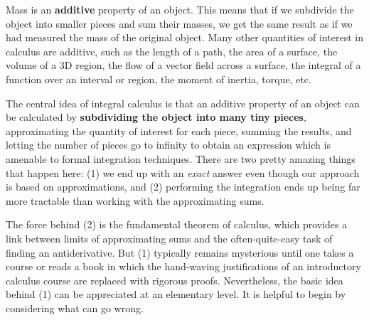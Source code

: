 \documentclass{watsonbook}
\begin{document}
Mass is an \textbf{additive} property of an object. This means that if
we subdivide the object into smaller pieces and sum their masses, we
get the same result as if we had measured the mass of the original
object. Many other quantities of interest in calculus are additive,
such as the length of a path, the area of a surface, the volume of a
3D region, the flow of a vector field across a surface, the integral
of a function over an interval or region, the moment of inertia,
torque, etc.

The central idea of integral calculus is that an additive property of
an object can be calculated by \textbf{subdividing the object into
  many tiny pieces}, approximating the quantity of interest for each
piece, summing the results, and letting the number of pieces go to
infinity to obtain an expression which is amenable to formal
integration techniques. There are two pretty amazing things that
happen here: (1) we end up with an \textit{exact} answer even though
our approach is based on approximations, and (2) performing the
integration ends up being far more tractable than working with the
approximating sums.

The force behind (2) is the fundamental theorem of calculus, which
provides a link between limits of approximating sums and the
often-quite-easy task of finding an antiderivative. But (1) typically
remains mysterious until one takes a course or reads a book in which
the hand-waving justifications of an introductory calculus course are
replaced with rigorous proofs. Nevertheless, the basic idea behind (1)
can be appreciated at an elementary level. It is helpful to begin by
considering what can go wrong. 
\end{document}
